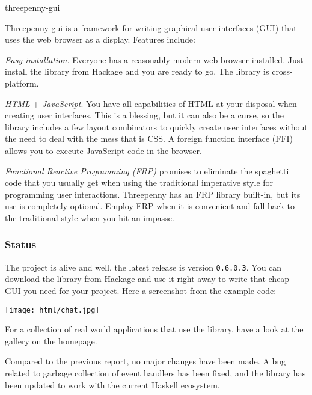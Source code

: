 \begin{hcarentry}[updated]{threepenny-gui}
\label{threepenny-gui}
\makeheader

Threepenny-gui is a framework for writing graphical user interfaces (GUI) that uses the web browser as a display. Features include:

\begin{compactitem}
\item \emph{Easy installation.} Everyone has a reasonably modern web browser installed. Just install the library from Hackage and you are ready to go. The library is cross-platform.
\item \emph{HTML} + \emph{JavaScript}. You have all capabilities of HTML at your disposal when creating user interfaces. This is a blessing, but it can also be a curse, so the library includes a few layout combinators to quickly create user interfaces without the need to deal with the mess that is CSS. A foreign function interface (FFI) allows you to execute JavaScript code in the browser.
\item \emph{Functional Reactive Programming (FRP)} promises to eliminate the spaghetti code that you usually get when using the traditional imperative style for programming user interactions. Threepenny has an FRP library built-in, but its use is completely optional. Employ FRP when it is convenient and fall back to the traditional style when you hit an impasse.
\end{compactitem}

\subsubsection*{Status}

The project is alive and well, the latest release is version \verb`0.6.0.3`. You can download the library from Hackage and use it right away to write that cheap GUI you need for your project. Here a screenshot from the example code:

\begin{center}
\texttt{[image: html/chat.jpg]}
\end{center}

For a collection of real world applications that use the library, have a look at the gallery on the homepage.

Compared to the previous report, no major changes have been made. A bug related to garbage collection of event handlers has been fixed, and the library has been updated to work with the current Haskell ecosystem.


\end{hcarentry}
